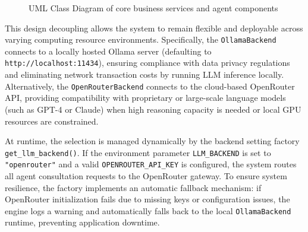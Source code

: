 \documentclass[../main.tex]{subfiles}
\begin{document}
\begin{figure}[H]
{%
    }
    \caption{UML Class Diagram of core business services and agent components}
    \label{fig:uml_class_diagram}
\end{figure}

This design decoupling allows the system to remain flexible and deployable across varying computing resource environments. Specifically, the \texttt{OllamaBackend} connects to a locally hosted Ollama server (defaulting to \texttt{http://localhost:11434}), ensuring compliance with data privacy regulations and eliminating network transaction costs by running LLM inference locally. Alternatively, the \texttt{OpenRouterBackend} connects to the cloud-based OpenRouter API, providing compatibility with proprietary or large-scale language models (such as GPT-4 or Claude) when high reasoning capacity is needed or local GPU resources are constrained.

At runtime, the selection is managed dynamically by the backend setting factory \nolinkurl{get\_llm\_backend()}. If the environment parameter \texttt{LLM\_BACKEND} is set to \texttt{"openrouter"} and a valid \texttt{OPENROUTER\_API\_KEY} is configured, the system routes all agent consultation requests to the OpenRouter gateway. To ensure system resilience, the factory implements an automatic fallback mechanism: if OpenRouter initialization fails due to missing keys or configuration issues, the engine logs a warning and automatically falls back to the local \texttt{OllamaBackend} runtime, preventing application downtime.
\end{document}
